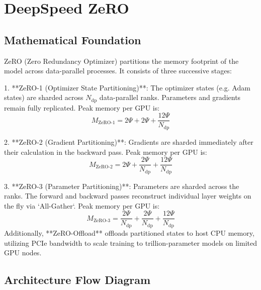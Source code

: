 \newpage
\section{DeepSpeed ZeRO}

\subsection{Mathematical Foundation}
ZeRO (Zero Redundancy Optimizer) partitions the memory footprint of the model across data-parallel processes. It consists of three successive stages:

1. **ZeRO-1 (Optimizer State Partitioning)**: The optimizer states (e.g. Adam states) are sharded across $N_{\text{dp}}$ data-parallel ranks. Parameters and gradients remain fully replicated. Peak memory per GPU is:
\begin{equation}
  M_{\text{ZeRO-1}} = 2\Psi + 2\Psi + \frac{12\Psi}{N_{\text{dp}}}
\end{equation}

2. **ZeRO-2 (Gradient Partitioning)**: Gradients are sharded immediately after their calculation in the backward pass. Peak memory per GPU is:
\begin{equation}
  M_{\text{ZeRO-2}} = 2\Psi + \frac{2\Psi}{N_{\text{dp}}} + \frac{12\Psi}{N_{\text{dp}}}
\end{equation}

3. **ZeRO-3 (Parameter Partitioning)**: Parameters are sharded across the ranks. The forward and backward passes reconstruct individual layer weights on the fly via `All-Gather`. Peak memory per GPU is:
\begin{equation}
  M_{\text{ZeRO-3}} = \frac{2\Psi}{N_{\text{dp}}} + \frac{2\Psi}{N_{\text{dp}}} + \frac{12\Psi}{N_{\text{dp}}}
\end{equation}
Additionally, **ZeRO-Offload** offloads partitioned states to host CPU memory, utilizing PCIe bandwidth to scale training to trillion-parameter models on limited GPU nodes.

\subsection{Architecture Flow Diagram}

